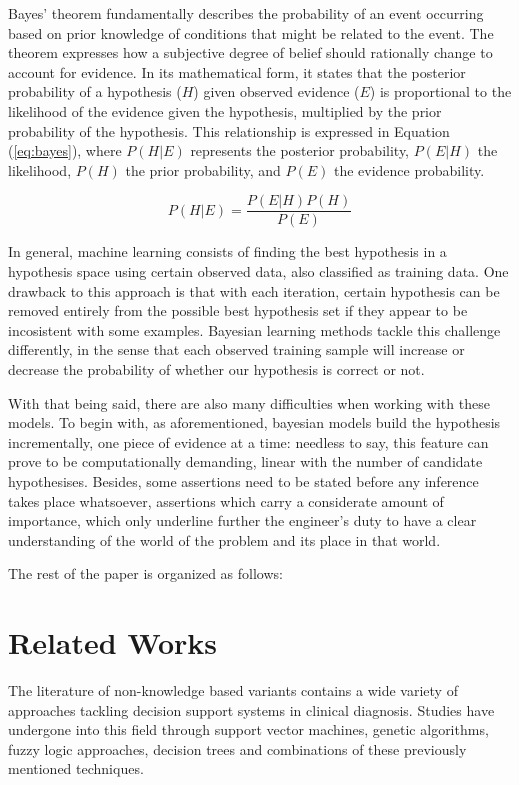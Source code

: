 \documentclass[3p,times,procedia]{elsarticle}
\begin{document}
Bayes' theorem fundamentally describes the probability of an event 
occurring based on prior knowledge of conditions that might be 
related to the event. The theorem expresses how a subjective 
degree of belief should rationally change to account for evidence.
In its mathematical form, it states that the posterior probability
of a hypothesis ($H$) given observed evidence ($E$) is proportional to
the likelihood of the evidence given the hypothesis, multiplied by
the prior probability of the hypothesis. This relationship is 
expressed in Equation (\ref{eq:bayes}), where $P(H|E)$ represents the
posterior probability, $P(E|H)$ the likelihood, $P(H)$ the prior
probability, and $P(E)$ the evidence probability. 

\begin{equation}
    P(H|E) = \frac{P(E|H)P(H)}{P(E)}
    \label{eq:bayes}
\end{equation}

In general, machine learning consists of finding the best
hypothesis in a hypothesis space using certain observed data, 
also classified as training data. One drawback to this
approach is that with each iteration, certain hypothesis can
be removed entirely from the possible best hypothesis set if
they appear to be incosistent with some examples. Bayesian 
learning methods tackle this challenge differently, in the 
sense that each observed training sample will increase or
decrease the probability of whether our hypothesis is correct
or not.

With that being said, there are also many difficulties when 
working with these models. To begin with, as aforementioned,
bayesian models build the hypothesis incrementally, one 
piece of evidence at a time: needless to say, this feature
can prove to be computationally demanding, linear with the 
number of candidate hypothesises. Besides, some assertions
need to be 
stated before any inference takes place whatsoever, assertions 
which carry a considerate amount of importance, which only
underline further the engineer's duty to have a clear 
understanding of the world of the problem and its place 
in that world.

The rest of the paper is organized as follows:

\section{Related Works}
The literature of non-knowledge based variants contains a wide
variety of approaches tackling decision support systems in
clinical diagnosis. Studies have undergone into this field 
through support vector machines, genetic algorithms, 
fuzzy logic approaches, decision trees and combinations 
of these previously mentioned techniques.
\end{document}
